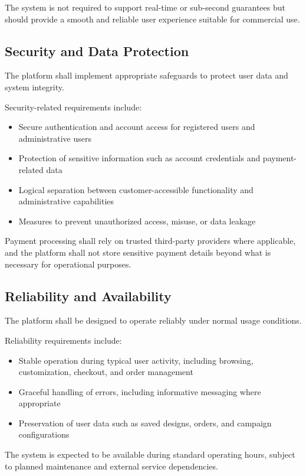 The system is not required to support real-time or sub-second guarantees but
should provide a smooth and reliable user experience suitable for commercial use.

\subsection{Security and Data Protection}

The platform shall implement appropriate safeguards to protect user data and
system integrity.

Security-related requirements include:
\begin{itemize}[leftmargin=1.5em]
    \item Secure authentication and account access for registered users and
    administrative users
    \item Protection of sensitive information such as account credentials and
    payment-related data
    \item Logical separation between customer-accessible functionality and
    administrative capabilities
    \item Measures to prevent unauthorized access, misuse, or data leakage
\end{itemize}

Payment processing shall rely on trusted third-party providers where applicable,
and the platform shall not store sensitive payment details beyond what is
necessary for operational purposes.

\subsection{Reliability and Availability}

The platform shall be designed to operate reliably under normal usage conditions.

Reliability requirements include:
\begin{itemize}[leftmargin=1.5em]
    \item Stable operation during typical user activity, including browsing,
    customization, checkout, and order management
    \item Graceful handling of errors, including informative messaging where
    appropriate
    \item Preservation of user data such as saved designs, orders, and campaign
    configurations
\end{itemize}

The system is expected to be available during standard operating hours, subject
to planned maintenance and external service dependencies.

